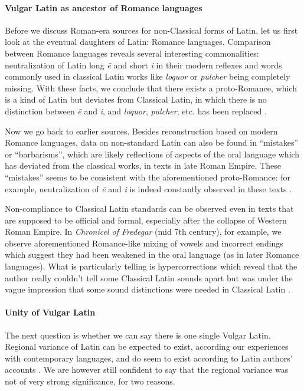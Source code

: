 \documentclass[a4paper, oneside, 12pt]{report}
\newcommand*{\citepage}[1]{p.~{#1}}
\newcommand*{\citepages}[1]{pp.~{#1}}
\newcommand{\form}[1]{\emph{#1}}
\newcommand{\literature}[1]{\textit{#1}}
\begin{document}
\paragraph*{Vulgar Latin as ancestor of Romance languages}
\label{sec:introduction.history.sub-elite.proto-romance}
Before we discuss Roman-era sources for non-Classical forms of Latin,
let us first look at the eventual daughters of Latin: Romance languages.
Comparison between Romance languages reveals several interesting commonalities:
neutralization of Latin long \form{\={e}} and short \form{i}
in their modern reflexes
and words commonly used in classical Latin works like \form{loquor} or \form{pulcher}
being completely missing.
With these facts, we conclude that there exists a proto-Romance,
which is a kind of Latin but deviates from Classical Latin,
in which there is no distinction between \form{\={e}} and \form{i}, 
and \form{loquor}, \form{pulcher}, etc. has been replaced
\citep[\citepages{1-3}]{herman2010vulgar}.

Now we go back to earlier sources.
Besides reconstruction based on modern Romance languages,
data on non-standard Latin can also be found in
``mistakes'' or ``barbarisms'', 
which are likely reflections of aspects of the oral language 
which has deviated from the classical works, 
in texts in late Roman Empire.
These ``mistakes'' seems to be consistent with the aforementioned proto-Romance:
for example, neutralization of \form{\={e}} and \form{i} is indeed constantly observed in these texts
\citep[\citepage{4}]{herman2010vulgar}.

Non-compliance to Classical Latin standards can be observed even in texts
that are supposed to be official and formal,
especially after the collapse of Western Roman Empire.
In \literature{Chronicel of Fredegar} (mid 7th century), for example, we observe
aforementioned Romance-like mixing of vowels
and incorrect endings which suggest they had been weakened in the oral language
(as in later Romance languages).
What is particularly telling is hypercorrections
which reveal that the author really couldn't tell some Classical Latin sounds apart
but was under the vague impression that
some sound distinctions were needed in Classical Latin
\citep[\citepages{158-159}]{leonhardt2013latin}.

\paragraph*{Unity of Vulgar Latin}
The next question is whether we can say there is one single Vulgar Latin.
Regional variance of Latin can be expected to exist,
according our experiences with contemporary languages,
and do seem to exist according to Latin authors' accounts
\citep[\citepage{116}]{herman2010vulgar}.
We are however still confident to say that the regional variance 
was not of very strong significance, for two reasons.
\end{document}
